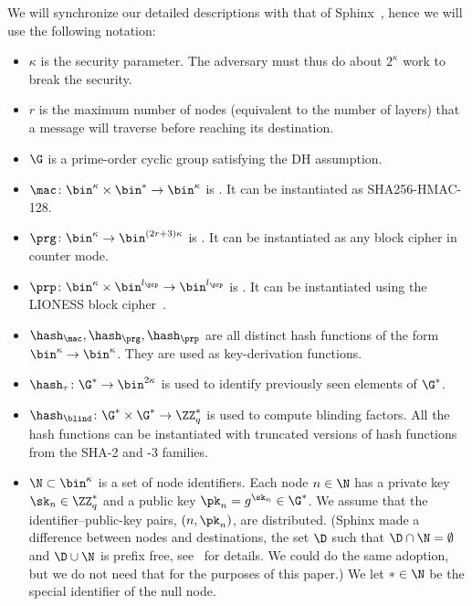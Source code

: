 \NewVariable{\mac}{\mu}
\NewVariable{\prg}{\rho}
\NewVariable{\prp}{\pi}

We will synchronize our detailed descriptions with that of 
Sphinx~\cite{Sphinx}, hence we will use the following notation:
\begin{itemize}
  \item \(\kappa\) is the security parameter.
    The adversary must thus do about \(2^\kappa\) work to break the security.

  \item \(r\) is the maximum number of nodes (\ie equivalent to the number of 
    layers) that a message will traverse before reaching its destination.

  \item \(\G\) is a prime-order cyclic group satisfying the \ac{DH} assumption.

  \item \(\mac\colon \bin^\kappa\times \bin^*\to \bin^\kappa\) is .
    It can be instantiated as \eg SHA256-HMAC-128.

  \item \(\prg\colon \bin^\kappa\to \bin^{(2r+3)\kappa}\) is .
    It can be instantiated as any block cipher in counter mode.

  \item \(\prp\colon \bin^\kappa\times \bin^{l_\prp} \to \bin^{l_\prp}\) is 
    .
    It can be instantiated using the LIONESS block cipher~\cite{LIONESS}.

  \item \(\hash_\mac, \hash_\prg, \hash_\prp\) are all distinct hash functions 
    of the form \(\bin^\kappa\to \bin^\kappa\).
    They are used as key-derivation functions.

  \item \(\hash_\tau\colon \G^*\to \bin^{2\kappa}\) is used to identify 
    previously seen elements of \(\G^*\).

  \item \(\hash_\blind\colon \G^*\times \G^*\to \ZZ_q^*\) is used to compute 
    blinding factors.
    All the hash functions can be instantiated with truncated versions of hash 
    functions from the SHA-2 and -3 families.

  \item \(\N\subset \bin^\kappa\) is a set of node identifiers.
    Each node \(n\in \N\) has a private key \(\sk_n\in \ZZ_q^*\) and a public 
    key \(\pk_n = g^{\sk_n}\in \G^*\).
    We assume that the identifier--public-key pairs, \((n, \pk_n)\), are 
    distributed.
    (Sphinx made a difference between nodes and destinations, \ie the set 
    \(\D\) such that \(\D\cap \N = \emptyset\) and \(\D\cup \N\) is prefix 
    free, see~\cite{Sphinx} for details.
    We could do the same adoption, but we do not need that for the purposes of 
    this paper.)
    We let \(*\in \N\) be the special identifier of the null node.


\end{itemize}
